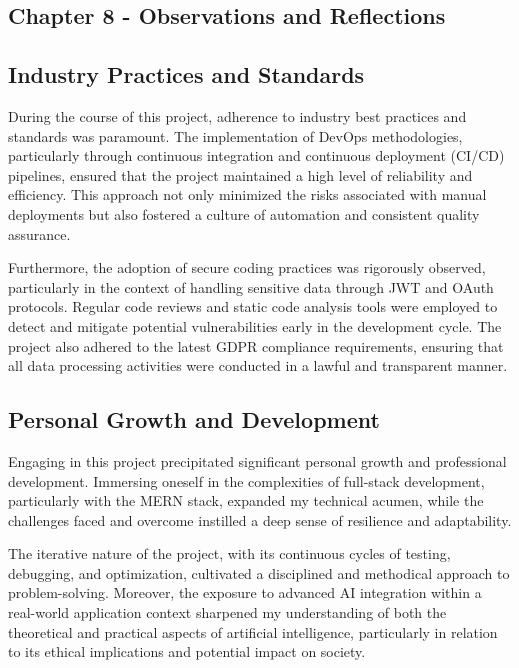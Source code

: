 \subsection{Chapter 8 - Observations and Reflections}

\subsection{Industry Practices and Standards}
During the course of this project, adherence to industry best practices and standards was paramount. The implementation of \gls{DevOps} methodologies, particularly through continuous integration and continuous deployment (CI/CD) pipelines, ensured that the project maintained a high level of reliability and efficiency. This approach not only minimized the risks associated with manual deployments but also fostered a culture of automation and consistent quality assurance.

Furthermore, the adoption of secure coding practices was rigorously observed, particularly in the context of handling sensitive data through \gls{JWT} and \gls{OAuth} protocols. Regular code reviews and static code analysis tools were employed to detect and mitigate potential vulnerabilities early in the development cycle. The project also adhered to the latest \gls{GDPR} compliance requirements, ensuring that all data processing activities were conducted in a lawful and transparent manner.


\subsection{Personal Growth and Development}
Engaging in this project precipitated significant personal growth and professional development. Immersing oneself in the complexities of full-stack development, particularly with the \gls{MERN} stack, expanded my technical acumen, while the challenges faced and overcome instilled a deep sense of resilience and adaptability.

The iterative nature of the project, with its continuous cycles of testing, debugging, and optimization, cultivated a disciplined and methodical approach to problem-solving. Moreover, the exposure to advanced \gls{AI} integration within a real-world application context sharpened my understanding of both the theoretical and practical aspects of artificial intelligence, particularly in relation to its ethical implications and potential impact on society.

